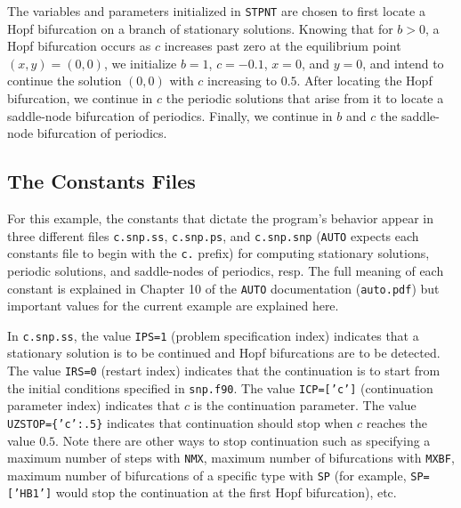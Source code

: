 \documentclass[a4paper,11pt]{article}
\begin{document}
The variables and parameters initialized in \texttt{STPNT} are chosen to first locate a Hopf bifurcation on a branch of stationary solutions. Knowing that for $b>0$, a Hopf bifurcation occurs as $c$ increases past zero at the equilibrium point $(x,y)=(0,0)$, we initialize $b=1$, $c=-0.1$, $x=0$, and $y=0$, and intend to continue the solution $(0,0)$ with $c$ increasing to $0.5$. After locating the Hopf bifurcation, we continue in $c$ the periodic solutions that arise from it to locate a saddle-node bifurcation of periodics. Finally, we continue in $b$ and $c$ the saddle-node bifurcation of periodics.

\subsection*{The Constants Files}

\noindent
For this example, the constants that dictate the program's behavior appear in three different files \texttt{c.snp.ss}, \texttt{c.snp.ps}, and \texttt{c.snp.snp} (\texttt{AUTO} expects each constants file to begin with the \texttt{c.} prefix) for computing stationary solutions, periodic solutions, and saddle-nodes of periodics, resp. The full meaning of each constant is explained in Chapter 10 of the \texttt{AUTO} documentation (\texttt{auto.pdf}) but important values for the current example are explained here.\vspace{3mm}

\noindent
In \texttt{c.snp.ss}, the value \texttt{IPS=1} (problem specification index) indicates that a stationary solution is to be continued and Hopf bifurcations are to be detected. The value \texttt{IRS=0} (restart index) indicates that the continuation is to start from the initial conditions specified in \texttt{snp.f90}. The value \texttt{ICP=['c']} (continuation parameter index) indicates that $c$ is the continuation parameter. The value \texttt{UZSTOP=\{'c':.5\}} indicates that continuation should stop when $c$ reaches the value $0.5.$ Note there are other ways to stop continuation such as specifying a maximum number of steps with \texttt{NMX}, maximum number of bifurcations with \texttt{MXBF}, maximum number of bifurcations of a specific type with \texttt{SP} (for example, \texttt{SP=['HB1']} would stop the continuation at the first Hopf bifurcation), etc.\vspace{3mm}
\end{document}
